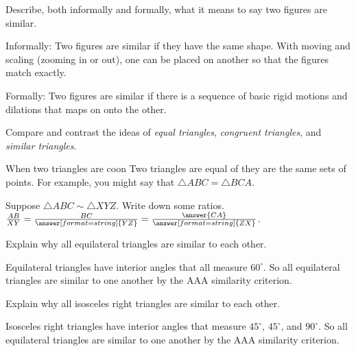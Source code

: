 \documentclass[nooutcomes]{ximera}
\begin{document}
\begin{question}
Describe, both informally and formally, what it means to say two figures are similar.
\begin{freeResponse}
\begin{hint}
Informally:  Two figures are similar if they have the same shape.  With moving and scaling (zooming in or out), one can be placed on another so that the figures match exactly.    

Formally:  Two figures are similar if there is a sequence of basic rigid motions and dilations that maps on onto the other.  
\end{hint}
\end{freeResponse}
\end{question}


\begin{question}
Compare and contrast the ideas of \textit{equal triangles},
  \textit{congruent triangles}, and \textit{similar triangles}.
\begin{freeResponse}
\begin{hint}
When two triangles are coon
Two triangles are equal of they are the same sets of points.  For example, you might say that $\triangle ABC = \triangle BCA$.  
\end{hint}
\end{freeResponse}
\end{question}

\begin{question}
Suppose $\triangle ABC \sim \triangle XYZ$.  Write down some ratios.  
$\frac{AB}{XY} = \frac{BC}{\answer[format=string]{YZ}} = \frac{\answer{CA}}{\answer[format=string]{ZX}}$.  
\end{question}


\begin{question}
Explain why all equilateral triangles are similar to each other.
\begin{freeResponse}
\begin{hint}
Equilateral triangles have interior angles that all measure $60^\circ$.  So all equilateral triangles are similar to one another by the AAA similarity criterion.  
\end{hint}
\end{freeResponse}
\end{question}

\begin{question}Explain why all isosceles right triangles are similar to each other. 
\begin{freeResponse}
\begin{hint}
Isosceles right triangles have interior angles that measure $45^\circ$, $45^\circ$, and $90^\circ$.  So all equilateral triangles are similar to one another by the AAA similarity criterion.  
\end{hint}
\end{freeResponse}
\end{question}
\end{document}
